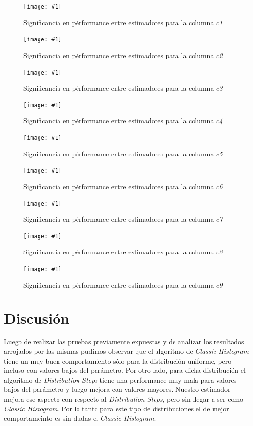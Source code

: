 \documentclass[a4paper, 10pt, twoside]{article}
\newcommand{\grafico}[3]{
  \begin{figure}[H]
    \texttt{[image: \#1]}
    \caption{#2}
    \label{#3}
  \end{figure}
}
\begin{document}
\grafico{plot-significance-c1}
        {Significancia en pérformance entre estimadores para la columna \emph{c1}}
        {student-columna-c1}

\grafico{plot-significance-c2}
        {Significancia en pérformance entre estimadores para la columna \emph{c2}}
        {student-columna-c2}

\grafico{plot-significance-c3}
        {Significancia en pérformance entre estimadores para la columna \emph{c3}}
        {student-columna-c3}

\grafico{plot-significance-c4}
        {Significancia en pérformance entre estimadores para la columna \emph{c4}}
        {student-columna-c4}

\grafico{plot-significance-c5}
        {Significancia en pérformance entre estimadores para la columna \emph{c5}}
        {student-columna-c5}

\grafico{plot-significance-c6}
        {Significancia en pérformance entre estimadores para la columna \emph{c6}}
        {student-columna-c6}

\grafico{plot-significance-c7}
        {Significancia en pérformance entre estimadores para la columna \emph{c7}}
        {student-columna-c7}

\grafico{plot-significance-c8}
        {Significancia en pérformance entre estimadores para la columna \emph{c8}}
        {student-columna-c8}

\grafico{plot-significance-c9}
        {Significancia en pérformance entre estimadores para la columna \emph{c9}}
        {student-columna-c9}



\section{Discusión}

Luego de realizar las pruebas previamente expuestas y de analizar los resultados arrojados por las mismas pudimos observar que el algoritmo de \textit{Classic Histogram}
tiene un muy buen comportamiento sólo para la distribución uniforme, pero incluso con valores bajos del parámetro. Por otro lado, para dicha distribución el algoritmo de \textit{Distribution Steps} tiene una performance muy mala para valores bajos del parámetro y luego mejora con valores mayores. Nuestro estimador mejora ese aspecto con respecto al \textit{Distribution Steps}, pero sin llegar a ser como \textit{Classic Histogram}. Por lo tanto para este tipo de distribuciones el de mejor comportameinto es sin dudas el \textit{Classic Histogram}.
\end{document}
